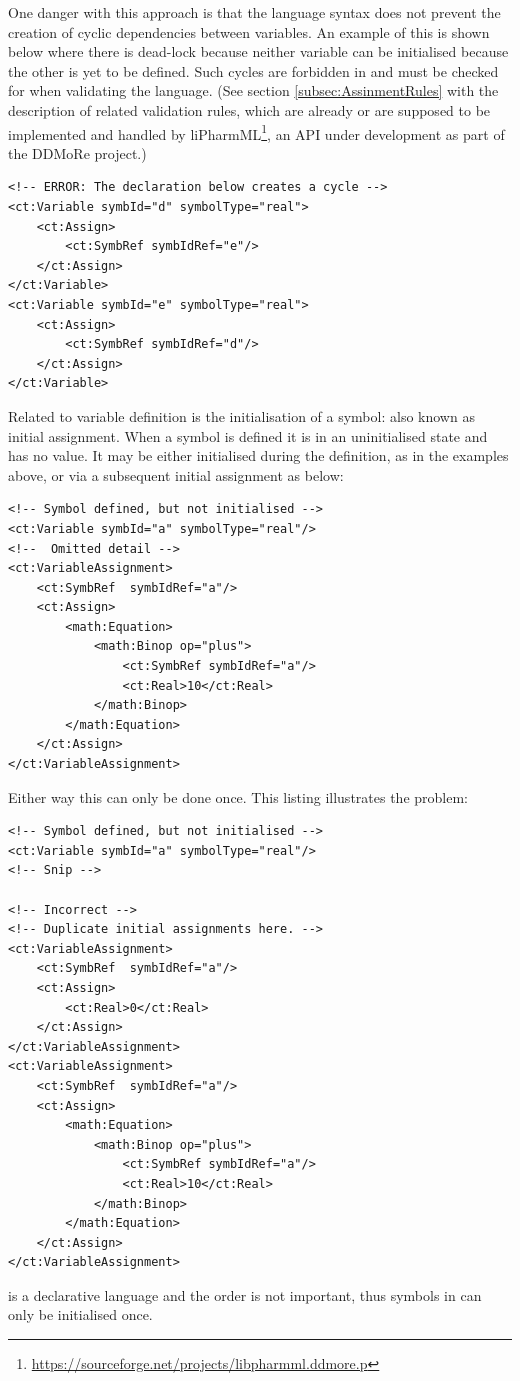 One danger with this approach is that the language syntax does not
prevent the creation of cyclic dependencies between variables. An
example of this is shown below where there is dead-lock because neither variable can be initialised
because the other is yet to be defined. Such cycles are forbidden in
\pharmml and must be checked for when validating the language.
(See section \ref{subsec:AssinmentRules} with the description of related
validation rules, which are already or are supposed to be implemented 
and handled by 
liPharmML\footnote{\url{https://sourceforge.net/projects/libpharmml.ddmore.p}}, 
an API under development as part of the DDMoRe project.)
\lstset{language=XML}
\begin{lstlisting}
<!-- ERROR: The declaration below creates a cycle -->
<ct:Variable symbId="d" symbolType="real">
    <ct:Assign>
        <ct:SymbRef symbIdRef="e"/>
    </ct:Assign>
</ct:Variable>
<ct:Variable symbId="e" symbolType="real">
    <ct:Assign>
        <ct:SymbRef symbIdRef="d"/>
    </ct:Assign>
</ct:Variable>
\end{lstlisting}

Related to variable definition is the initialisation of a symbol: also
known as initial assignment. When a symbol is defined it is in an
uninitialised state and has no value. It may be either initialised
during the definition, as in the examples above, or via a subsequent
initial assignment as below:

\lstset{language=XML}
\begin{lstlisting}
<!-- Symbol defined, but not initialised -->
<ct:Variable symbId="a" symbolType="real"/>
<!--  Omitted detail -->
<ct:VariableAssignment>
    <ct:SymbRef  symbIdRef="a"/>
    <ct:Assign>
        <math:Equation>
            <math:Binop op="plus">
                <ct:SymbRef symbIdRef="a"/>
                <ct:Real>10</ct:Real>
            </math:Binop>
        </math:Equation>
    </ct:Assign>
</ct:VariableAssignment>
\end{lstlisting}

Either way this can only be done once. This listing illustrates the problem:
\lstset{language=XML}
\begin{lstlisting}
<!-- Symbol defined, but not initialised -->
<ct:Variable symbId="a" symbolType="real"/>
<!-- Snip -->

<!-- Incorrect -->
<!-- Duplicate initial assignments here. -->
<ct:VariableAssignment>
    <ct:SymbRef  symbIdRef="a"/>
    <ct:Assign>
        <ct:Real>0</ct:Real>
    </ct:Assign>
</ct:VariableAssignment>
<ct:VariableAssignment>
    <ct:SymbRef  symbIdRef="a"/>
    <ct:Assign>
        <math:Equation>
            <math:Binop op="plus">
                <ct:SymbRef symbIdRef="a"/>
                <ct:Real>10</ct:Real>
            </math:Binop>
        </math:Equation>
    </ct:Assign>
</ct:VariableAssignment>
\end{lstlisting}
\pharmml is a declarative language and the order is not important, 
thus symbols in \pharmml can only be initialised
once.


